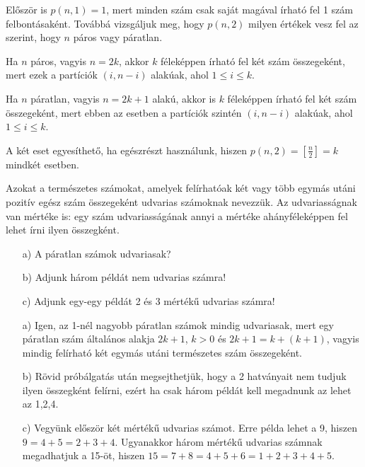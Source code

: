 \begin{solution}
Először is $p(n,1)=1$, mert minden szám csak saját magával írható
fel 1 szám felbontásaként. Továbbá vizsgáljuk meg, hogy $p(n,2)$
milyen értékek vesz fel az szerint, hogy $n$ páros vagy páratlan.

Ha $n$ páros, vagyis $n=2k$, akkor $k$ féleképpen írható fel két
szám összegeként, mert ezek a partíciók $(i,n-i)$ alakúak, ahol $1\leq i\leq k$.

Ha $n$ páratlan, vagyis $n=2k+1$ alakú, akkor is $k$ féleképpen
írható fel két szám összegeként, mert ebben az esetben a partíciók
szintén $(i,n-i)$ alakúak, ahol $1\leq i\leq k$.

A két eset egyesíthető, ha egészrészt használunk, hiszen $p(n,2)=\left[\frac{n}{2}\right]=k$
mindkét esetben. 
\end{solution}
\begin{problem}
Azokat a természetes számokat, amelyek felírhatóak két vagy több egymás
utáni pozitív egész szám összegeként udvarias számoknak nevezzük.
Az udvariasságnak van mértéke is: egy szám udvariasságának annyi a
mértéke ahányféleképpen fel lehet írni ilyen összegként. 
\begin{enumerate}
\item[a)] A páratlan számok udvariasak? 
\item[b)] Adjunk három példát nem udvarias számra! 
\item[c)] Adjunk egy-egy példát 2 és 3 mértékű udvarias számra! 
\end{enumerate}
\end{problem}
\begin{solution}
\hspace{0cm}
\begin{enumerate}
\item[a)] Igen, az 1-nél nagyobb páratlan számok mindig udvariasak, mert egy
páratlan szám általános alakja $2k+1$, $k>0$ és $2k+1=k+(k+1)$,
vagyis mindig felírható két egymás utáni természetes szám összegeként. 
\item[b)] Rövid próbálgatás után megsejthetjük, hogy a 2 hatványait nem tudjuk
ilyen összegként felírni, ezért ha csak három példát kell megadnunk
az lehet az 1,2,4. 
\item[c)] Vegyünk először két mértékű udvarias számot. Erre példa lehet a 9,
hiszen $9=4+5=2+3+4$. Ugyanakkor három mértékű udvarias számnak megadhatjuk
a 15-öt, hiszen $15=7+8=4+5+6=1+2+3+4+5$. 
\end{enumerate}
\end{solution}
